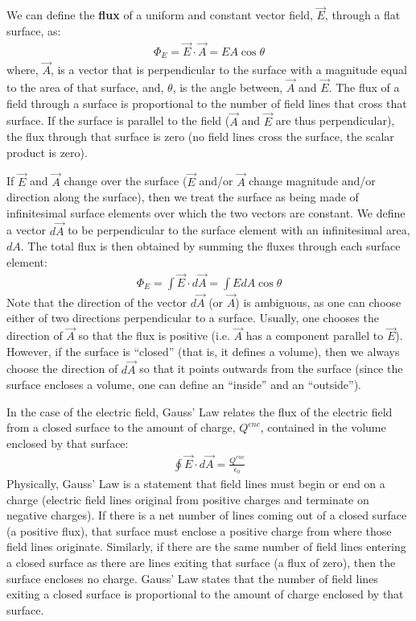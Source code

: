 \begin{chapterSummary}
We can define the \textbf{flux} of a uniform and constant vector field, $\vec E$, through a flat surface, as:
\begin{align*}
\Phi_E = \vec E \cdot \vec A = EA\cos\theta
\end{align*}
where, $\vec A$, is a vector that is perpendicular to the surface with a magnitude equal to the area of that surface, and, $\theta$, is the angle between, $\vec A$ and $\vec E$. The flux of a field through a surface is proportional to the number of field lines that cross that surface. If the surface is parallel to the field ($\vec A$ and $\vec E$ are thus perpendicular), the flux through that surface is zero (no field lines cross the surface, the scalar product is zero).

If $\vec E$ and $\vec A$ change over the surface ($\vec E$ and/or $\vec A$ change magnitude and/or direction along the surface), then we treat the surface as being made of infinitesimal surface elements over which the two vectors are constant. We define a vector $d\vec A$ to be perpendicular to the surface element with an infinitesimal area, $dA$. The total flux is then obtained by summing the fluxes through each surface element:
\begin{align*}
\Phi_E=\int \vec E \cdot d\vec A=\int EdA\cos\theta
\end{align*}
Note that the direction of the vector $d\vec A$ (or $\vec A$) is ambiguous, as one can choose either of two directions perpendicular to a surface. Usually, one chooses the direction of $\vec A$ so that the flux is positive (i.e. $\vec A$ has a component parallel to $\vec E$). However, if the surface is ``closed'' (that is, it defines a volume), then we always choose the direction of $d\vec A$ so that it points outwards from the surface (since the surface encloses a volume, one can define an ``inside'' and an ``outside''). 

In the case of the electric field, Gauss' Law relates the flux of the electric field from a closed surface to the amount of charge, $Q^{enc}$, contained in the volume enclosed by that surface:
\begin{align*}
\oint \vec E \cdot d\vec A = \frac{Q^{enc}}{\epsilon_0}
\end{align*}
Physically, Gauss' Law is a statement that field lines must begin or end on a charge (electric field lines original from positive charges and terminate on negative charges). If there is a net number of lines coming out of a closed surface (a positive flux), that surface must enclose a positive charge from where those field lines originate. Similarly, if there are the same number of field lines entering a closed surface as there are lines exiting that surface (a flux of zero), then the surface encloses no charge. Gauss' Law states that the number of field lines exiting a closed surface is proportional to the amount of charge enclosed by that surface.


\end{chapterSummary}
